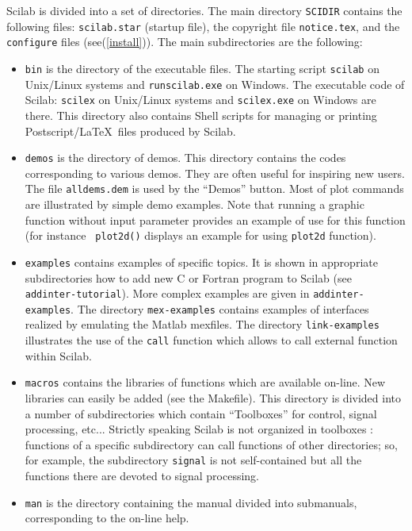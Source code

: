 Scilab is divided into a set of directories. The main directory
\verb!SCIDIR! contains the following files: {\tt scilab.star} (startup file), the
copyright file {\tt notice.tex}, and the \verb!configure! files
(see(\ref{install})).
The main subdirectories are the following:
\begin{itemize}

\item{{\tt bin} is the directory of the executable files.
The starting script {\tt scilab} on Unix/Linux systems and {\tt runscilab.exe} on Windows.
The executable code of Scilab: {\tt scilex} on Unix/Linux systems and {\tt scilex.exe} on 
Windows are there. 
This directory also contains Shell scripts 
for managing or printing Postscript/\LaTeX\  files produced by Scilab.}

\item{{\tt demos} is the directory of demos. 
This directory contains the codes corresponding
to various demos. They are often useful for inspiring new users.
The file 
{\tt alldems.dem} is used by the  ``Demos'' button. 
Most of plot commands are illustrated by simple demo examples. 
Note that running a graphic function without input parameter
provides an example of use for this function (for instance {\tt
plot2d()} displays an example for using {\tt plot2d}  function). }

\item{{\tt examples} contains examples of specific topics. It is shown
in appropriate subdirectories how to add new C or Fortran program
to Scilab (see \verb!addinter-tutorial!). More complex examples are given
in \verb!addinter-examples!. The directory \verb!mex-examples!
contains examples of interfaces realized by emulating the Matlab
mexfiles. The directory \verb!link-examples! illustrates the use of
the \verb!call! function which allows to call external function within
Scilab.}

\item{{\tt macros} contains the libraries of functions
which are available on-line. New libraries can easily be added 
(see the Makefile). This directory is divided into a number of subdirectories
which contain ``Toolboxes'' for control, signal processing, etc... Strictly
speaking Scilab is not organized in toolboxes : functions of a specific
subdirectory can call functions of other directories; so, for example, the 
subdirectory {\tt signal} is not self-contained but all the functions there 
are devoted to signal processing.}

\item{{\tt man} is the directory containing the manual divided 
into submanuals, corresponding to the on-line help.}


\end{itemize}
